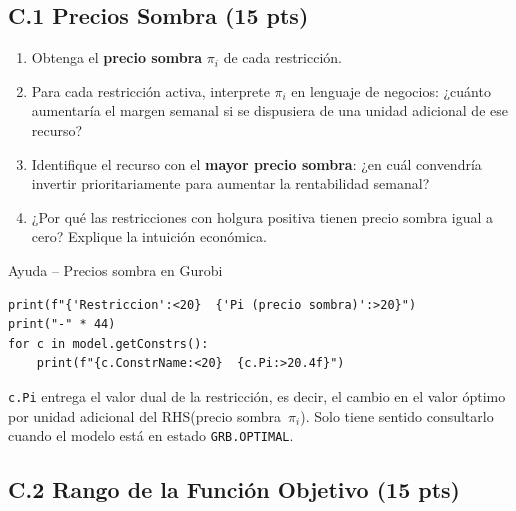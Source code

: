 \documentclass[12pt,a4paper]{article}
\begin{document}
\subsection*{C.1 \quad Precios Sombra \hfill\normalfont\normalsize(15 pts)}

\begin{enumerate}[label=\alph*), leftmargin=*, topsep=2pt]
    \item Obtenga el \textbf{precio sombra} $\pi_i$ de cada restricción.
    \item Para cada restricción activa, interprete $\pi_i$ en lenguaje de
          negocios: ¿cuánto aumentaría el margen semanal si se dispusiera
          de una unidad adicional de ese recurso?
    \item Identifique el recurso con el \textbf{mayor precio sombra}:
          ¿en cuál convendría invertir prioritariamente para aumentar la
          rentabilidad semanal?
    \item ¿Por qué las restricciones con holgura positiva tienen precio
          sombra igual a cero? Explique la intuición económica.
\end{enumerate}

\begin{ayuda}{Ayuda -- Precios sombra en Gurobi}
\begin{lstlisting}
print(f"{'Restriccion':<20}  {'Pi (precio sombra)':>20}")
print("-" * 44)
for c in model.getConstrs():
    print(f"{c.ConstrName:<20}  {c.Pi:>20.4f}")
\end{lstlisting}
\texttt{c.Pi} entrega el valor dual de la restricción, es decir, el cambio
en el valor óptimo por unidad adicional del RHS\@ (precio sombra~$\pi_i$).
Solo tiene sentido consultarlo cuando el modelo está en estado
\texttt{GRB.OPTIMAL}.
\end{ayuda}

\vspace{0.5em}
\newpage
\subsection*{C.2 \quad Rango de la Función Objetivo \hfill\normalfont\normalsize(15 pts)}
\end{document}
